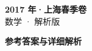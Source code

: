 \documentclass[zihao=-4, a4paper]{ctexart}
\begin{document}
\begin{center}
  {\Large\bfseries 2017 年·上海春季卷}\\[4pt]
  {\large 数学 · 解析版}
\end{center}
\medskip
{}

\clearpage
{}
\begin{center}{\Large\bfseries 参考答案与详细解析}\end{center}
\medskip

\end{document}
